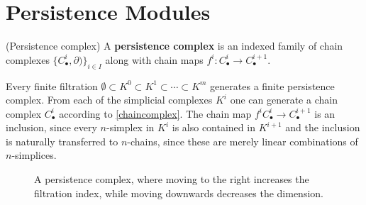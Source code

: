 \section{Persistence Modules}
\begin{definition}{(Persistence complex)}
\label{persistencecomplex}
A \textbf{persistence complex} is an indexed family of chain complexes $\{C_\bullet^i, \partial)\}_{i \in I}$ along with chain maps $f^i: C_\bullet^i \rightarrow C_\bullet^{i+1}$.
\end{definition}

Every finite filtration $\emptyset \subset K^0 \subset K^1 \subset \cdots \subset K^m$ generates a finite persistence complex. From each of the simplicial complexes $K^i$ one can generate a chain complex $C_\bullet^i$ according to \ref{chaincomplex}. The chain map $f^i C_\bullet^i \rightarrow C_\bullet^{i+1}$ is an inclusion, since every $n$-simplex in $K^i$ is also contained in $K^{i+1}$ and the inclusion is naturally transferred to $n$-chains, since these are merely linear combinations of $n$-simplices.

\begin{figure}
\centering
{}
\caption[A persistence complex]{A persistence complex, where moving to the right increases the filtration index, while moving downwards decreases the dimension.}
\end{figure}

